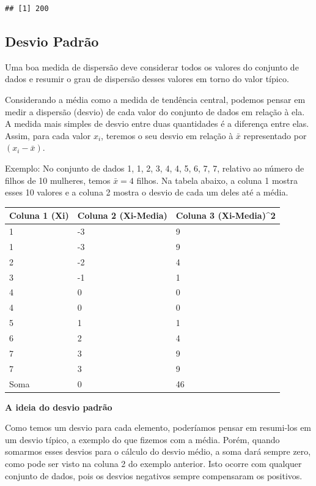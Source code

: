 \documentclass[
]{book}
\begin{document}
\begin{verbatim}
## [1] 200
\end{verbatim}

\hypertarget{desvio-padruxe3o}{%
\subsection{Desvio Padrão}\label{desvio-padruxe3o}}

Uma boa medida de dispersão deve considerar todos os valores do conjunto de dados e resumir o grau de dispersão desses valores em torno do valor típico.

Considerando a média como a medida de tendência central, podemos pensar em medir a dispersão (desvio) de cada valor do conjunto de dados em relação à ela. A medida mais simples de desvio entre duas quantidades é a diferença entre elas. Assim, para cada valor \(x_i\), teremos o seu desvio em relação à \(\bar x\) representado por \((x_i-\bar x)\).

Exemplo: No conjunto de dados 1, 1, 2, 3, 4, 4, 5, 6, 7, 7, relativo ao número de filhos de 10 mulheres, temos \(\bar x = 4\) filhos. Na tabela abaixo, a coluna 1 mostra esses 10 valores e a coluna 2 mostra o desvio de cada um deles até a média.

\begin{tabular}{l|l|l}
\hline
Coluna 1 (Xi) & Coluna 2 (Xi-Media) & Coluna 3 (Xi-Media)\textasciicircum{}2\\
\hline
1 & -3 & 9\\
\hline
1 & -3 & 9\\
\hline
2 & -2 & 4\\
\hline
3 & -1 & 1\\
\hline
4 & 0 & 0\\
\hline
4 & 0 & 0\\
\hline
5 & 1 & 1\\
\hline
6 & 2 & 4\\
\hline
7 & 3 & 9\\
\hline
7 & 3 & 9\\
\hline
Soma & 0 & 46\\
\hline
\end{tabular}

\textbf{A ideia do desvio padrão}

Como temos um desvio para cada elemento, poderíamos pensar em resumi-los em um desvio típico, a exemplo do que fizemos com a média. Porém, quando somarmos esses desvios para o cálculo do desvio médio, a soma dará sempre zero, como pode ser visto na coluna 2 do exemplo anterior. Isto ocorre com qualquer conjunto de dados, pois os desvios negativos sempre compensaram os positivos.
\end{document}
